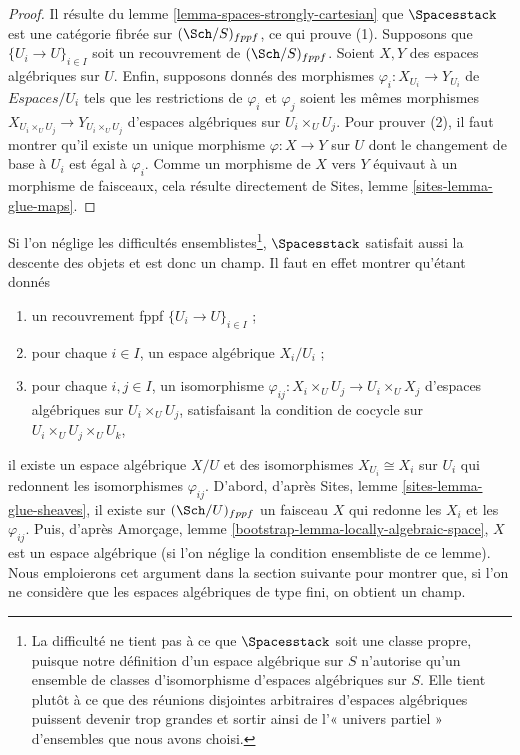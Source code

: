 \begin{proof}
Il résulte du
lemme \ref{lemma-spaces-strongly-cartesian}
que $\Spacesstack$ est une catégorie fibrée sur $(\Sch/S)_{fppf}$,
ce qui prouve (1).
Supposons que $\{U_i \to U\}_{i \in I}$ soit un recouvrement de
$(\Sch/S)_{fppf}$. Soient $X, Y$ des espaces algébriques sur
$U$. Enfin, supposons donnés des morphismes $\varphi_i : X_{U_i} \to Y_{U_i}$
de $\textit{Espaces}/U_i$ tels que les restrictions de $\varphi_i$ et $\varphi_j$
soient les mêmes morphismes $X_{U_i \times_U U_j} \to Y_{U_i \times_U U_j}$
d'espaces algébriques sur $U_i \times_U U_j$.
Pour prouver (2), il faut montrer qu'il existe un unique morphisme
$\varphi  : X \to Y$ sur $U$ dont le changement de base à $U_i$ est
égal à $\varphi_i$. Comme un morphisme de $X$ vers $Y$ équivaut à
un morphisme de faisceaux, cela résulte directement de
Sites, lemme \ref{sites-lemma-glue-maps}.
\end{proof}

\begin{remark}
\label{remark-stack-spaces}
Si l'on néglige les difficultés ensemblistes\footnote{La difficulté ne tient pas
à ce que $\Spacesstack$ soit une classe propre, puisque notre définition d'un
espace algébrique sur $S$ n'autorise qu'un ensemble de
classes d'isomorphisme d'espaces algébriques sur $S$. Elle tient plutôt à ce que
des réunions disjointes arbitraires d'espaces algébriques puissent devenir trop grandes
et sortir ainsi de l'« univers partiel » d'ensembles que nous avons choisi.},
$\Spacesstack$ satisfait aussi
la descente des objets et est donc un champ. Il faut en effet montrer qu'étant donnés
\begin{enumerate}
\item un recouvrement fppf $\{U_i \to U\}_{i \in I}$ ;
\item pour chaque $i \in I$, un espace algébrique $X_i/U_i$ ;
\item pour chaque $i, j \in I$, un isomorphisme
$\varphi_{ij} : X_i \times_U U_j \to U_i \times_U X_j$ d'espaces algébriques
sur $U_i \times_U U_j$, satisfaisant la condition de cocycle sur
$U_i \times_U U_j \times_U U_k$,
\end{enumerate}
il existe un espace algébrique $X/U$ et des isomorphismes
$X_{U_i} \cong X_i$ sur $U_i$ qui redonnent les isomorphismes $\varphi_{ij}$.
D'abord, d'après
Sites, lemme \ref{sites-lemma-glue-sheaves},
il existe sur $(\Sch/U)_{fppf}$ un faisceau $X$ qui redonne
les $X_i$ et les $\varphi_{ij}$. Puis, d'après
Amorçage, lemme \ref{bootstrap-lemma-locally-algebraic-space},
$X$ est un espace algébrique (si l'on néglige la condition ensembliste
de ce lemme).
Nous emploierons cet argument dans la section suivante pour montrer que,
si l'on ne considère que les espaces algébriques de type fini, on obtient
un champ.
\end{remark}





